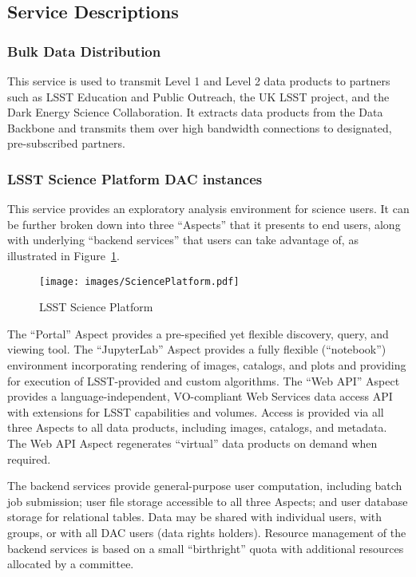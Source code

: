 \documentclass[DM,toc]{lsstdoc}
\begin{document}
\subsection{Service Descriptions}\label{dac-service-descriptions}

\subsubsection{Bulk Data Distribution}\label{bulk-data-distribution}

This service is used to transmit Level 1 and Level 2 data products to
partners such as LSST Education and Public Outreach, the UK LSST
project, and the Dark Energy Science Collaboration. It extracts data
products from the Data Backbone and transmits them over high bandwidth
connections to designated, pre-subscribed partners.

\subsubsection{LSST Science Platform DAC
instances}\label{lsst-science-platform-dac-instances}

This service provides an exploratory analysis environment for science
users. It can be further broken down into three ``Aspects'' that it
presents to end users, along with underlying ``backend services'' that
users can take advantage of, as illustrated in Figure~\ref{fig:lsp}.

\begin{figure}
\centering
\texttt{[image: images/SciencePlatform.pdf]}
\caption{LSST Science Platform}
\label{fig:lsp}
\end{figure}

The ``Portal'' Aspect provides a pre-specified yet flexible discovery,
query, and viewing tool. The ``JupyterLab'' Aspect provides a fully
flexible (``notebook'') environment incorporating rendering of images,
catalogs, and plots and providing for execution of LSST-provided and
custom algorithms. The ``Web API'' Aspect provides a
language-independent, VO-compliant Web Services data access API with
extensions for LSST capabilities and volumes. Access is provided via all
three Aspects to all data products, including images, catalogs, and
metadata. The Web API Aspect regenerates ``virtual'' data products on
demand when required.

The backend services provide general-purpose user computation, including
batch job submission; user file storage accessible to all three Aspects;
and user database storage for relational tables.  Data may be shared with
individual users, with groups, or with all DAC users (data rights
holders). Resource management of the backend services is based on a
small ``birthright'' quota with additional resources allocated by a
committee.
\end{document}
